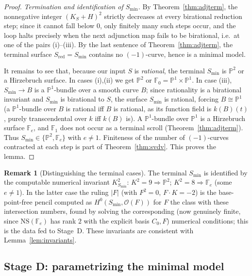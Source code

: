 \documentclass{amsart}
\theoremstyle{plain}
\theoremstyle{definition}
\newtheorem{remark}{Remark}
\newcommand{\PP}{\mathbb{P}}
\newcommand{\cO}{\mathcal{O}}
\begin{document}
\begin{proof}
\emph{Termination and identification of $S_{\min}$.}  By
Theorem~\ref{thm:adjterm}, the nonnegative integer $(K_S+H)^2$ strictly decreases
at every birational reduction step; since it cannot fall below $0$, only finitely
many such steps occur, and the loop halts precisely when the next adjunction map
fails to be birational, i.e.\ at one of the pairs (i)--(iii).  By the last
sentence of Theorem~\ref{thm:adjterm}, the terminal surface
$S_{\mathrm{red}}=S_{\min}$ contains no $(-1)$-curve, hence is a minimal model.

It remains to see that, because our input $S$ is \emph{rational}, the terminal
$S_{\min}$ is $\PP^2$ or a Hirzebruch surface.  In cases (i),(ii) we get $\PP^2$
or $\mathbb F_0=\PP^1\times\PP^1$.  In case (iii), $S_{\min}\to B$ is a
$\PP^1$-bundle over a smooth curve $B$; since rationality is a birational
invariant and $S_{\min}$ is birational to $S$, the surface $S_{\min}$ is rational,
forcing $B\cong\PP^1$ (a $\PP^1$-bundle over $B$ is rational iff $B$ is rational,
as its function field is $k(B)(t)$, purely transcendental over $k$ iff $k(B)$
is).  A $\PP^1$-bundle over $\PP^1$ is a Hirzebruch surface $\mathbb F_e$, and
$\mathbb F_1$ does not occur as a terminal scroll (Theorem~\ref{thm:adjterm}).
Thus $S_{\min}\in\{\PP^2,\mathbb F_e\}$ with $e\ne1$.  Finiteness of the number of
$(-1)$-curves contracted at each step is part of Theorem~\ref{thm:svdv}.  This
proves the lemma.
\end{proof}

\begin{remark}[Distinguishing the terminal cases]\label{rem:terminal}
The terminal $S_{\min}$ is identified by the computable numerical invariant
$K_{S_{\min}}^2$: $K^2=9\Rightarrow\PP^2$; $K^2=8\Rightarrow\mathbb F_e$
(some $e\ne1$).  In the latter case the ruling $|F|$ (with $F^2=0$,
$F\cdot K=-2$) is the base-point-free pencil computed as $H^0(S_{\min},\cO(F))$
for $F$ the class with these intersection numbers, found by solving the
corresponding (now genuinely finite, since $\mathrm{NS}(\mathbb F_e)$ has rank
$2$ with the explicit basis $C_0,F$) numerical conditions; this is the data fed
to Stage~D.  These invariants are consistent with
Lemma~\ref{lem:invariants}.
\end{remark}

\subsection{Stage D: parametrizing the minimal model}
\end{document}
